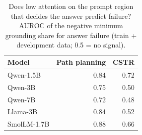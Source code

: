 \begin{table}[!htbp]
\centering
\small
\caption{Does low attention on the prompt region that decides the answer predict failure? AUROC of the negative minimum grounding share for answer failure (train + development data; 0.5 = no signal).}
\label{tab:mechanism}
\begin{tabular}{lrr}
\toprule
Model & Path planning & CSTR \\
\midrule
Qwen-1.5B & 0.84 & 0.72 \\
Qwen-3B & 0.75 & 0.50 \\
Qwen-7B & 0.72 & 0.48 \\
Llama-3B & 0.84 & 0.52 \\
SmolLM-1.7B & 0.88 & 0.66 \\
\bottomrule
\end{tabular}
\end{table}
